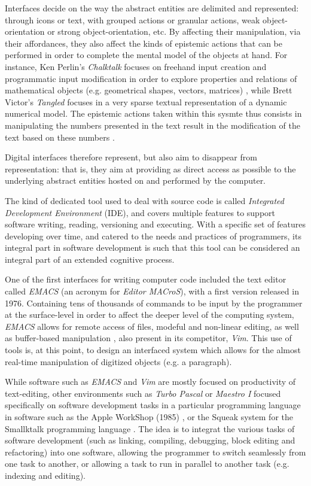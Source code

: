 Interfaces decide on the way the abstract entities are delimited and represented: through icons or text, with grouped actions or granular actions, weak object-orientation or strong object-orientation, etc. By affecting their manipulation, via their affordances, they also affect the kinds of epistemic actions that can be performed in order to complete the mental model of the objects at hand. For instance, Ken Perlin's \emph{Chalktalk} focuses on freehand input creation and programmatic input modification in order to explore properties and relations of mathematical objects (e.g. geometrical shapes, vectors, matrices) \citep{perlin_chalktalk_2022}, while Brett Victor's \emph{Tangled} focuses in a very sparse textual representation of a dynamic numerical model. The epistemic actions taken within this sysmte thus consists in manipulating the numbers presented in the text result in the modification of the text based on these numbers \citep{victor_tangle_2011,victor_explorable_2011}.

Digital interfaces therefore represent, but also aim to disappear from representation: that is, they aim at providing as direct access as possible to the underlying abstract entities hosted on and performed by the computer.

The kind of dedicated tool used to deal with source code is called \emph{Integrated Development Environment} (IDE), and covers multiple features to support software writing, reading, versioning and executing. With a specific set of features developing over time, and catered to the needs and practices of programmers, its integral part in software development is such that this tool can be considered an integral part of an extended cognitive process.

One of the first interfaces for writing computer code included the text editor called \emph{EMACS} (an acronym for \emph{Editor MACroS}), with a first version released in 1976. Containing tens of thousands of commands to be input by the programmer at the surface-level in order to affect the deeper level of the computing system, \emph{EMACS} allows for remote access of files, modeful and non-linear editing, as well as buffer-based manipulation \citep{greenberg_multics_1996}, also present in its competitor, \emph{Vim}. This use of tools is, at this point, to design an interfaced system which allows for the almost real-time manipulation of digitized objects (e.g. a paragraph).

While software such as \emph{EMACS} and \emph{Vim} are mostly focused on productivity of text-editing, other environments such as \emph{Turbo Pascal} or \emph{Maestro I} focused specifically on software development tasks in a particular programming language in software such as the Apple WorkShop (1985) \citep{west_macintosh_1987}, or the Squeak system for the Smallktalk programming language \citep{ingalls_back_1997}. The idea is to integrat the various tasks of software development (such as linking, compiling, debugging, block editing and refactoring) into one software, allowing the programmer to switch seamlessly from one task to another, or allowing a task to run in parallel to another task (e.g. indexing and editing).

